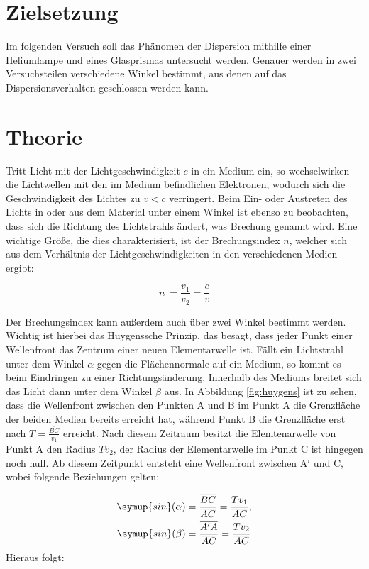 \section{Zielsetzung}
Im folgenden Versuch soll das Phänomen der Dispersion mithilfe einer Heliumlampe und eines Glasprismas untersucht werden. Genauer werden in zwei Versuchsteilen verschiedene Winkel bestimmt, aus denen auf das Dispersionsverhalten geschlossen werden kann.


\section{Theorie}
Tritt Licht mit der Lichtgeschwindigkeit $c$ in ein Medium ein, so wechselwirken die Lichtwellen mit den im Medium befindlichen Elektronen, wodurch sich die Geschwindigkeit des Lichtes  zu $v < c$ verringert. Beim Ein- oder Austreten des Lichts in oder aus 
dem Material unter einem Winkel ist ebenso zu beobachten, dass sich die Richtung des Lichtstrahls ändert, was Brechung genannt wird. Eine wichtige Größe, die dies charakterisiert, ist der Brechungsindex $n$, welcher sich aus dem Verhältnis der Lichtgeschwindigkeiten 
in den verschiedenen Medien ergibt:

\begin{equation}
n \:= \frac{v_1}{v_2} = \frac{c}{v}
\end{equation}

Der Brechungsindex kann außerdem auch über zwei Winkel bestimmt werden. Wichtig ist hierbei das Huygenssche Prinzip, das besagt, dass jeder Punkt einer Wellenfront das Zentrum einer neuen Elementarwelle ist. Fällt ein Lichtstrahl unter dem Winkel $\alpha$ gegen 
die Flächennormale auf ein Medium, so kommt es beim Eindringen zu einer Richtungsänderung. Innerhalb des Mediums breitet sich das Licht dann unter dem Winkel $\beta$ aus. 
In Abbildung \ref{fig:huygens} ist zu sehen, dass die Wellenfront zwischen den Punkten A und B im  Punkt A die Grenzfläche der beiden Medien bereits erreicht hat, während Punkt B die Grenzfläche erst nach $T = \frac{\overline{BC}}{v_1}$ erreicht. Nach diesem Zeitraum besitzt die Elemtenarwelle von 
Punkt A den Radius $Tv_2$, der Radius der Elementarwelle im Punkt C ist hingegen noch null. Ab diesem Zeitpunkt entsteht eine Wellenfront zwischen A‘ und C, wobei folgende Beziehungen gelten:

\begin{equation}
\begin{aligned}
\symup{sin}(\alpha) &= \frac{\overline{BC}}{\overline{AC}} = \frac{Tv_1}{\overline{AC}}, \\
\symup{sin}(\beta) &= \frac{\overline{A'A}}{\overline{AC}} = \frac{Tv_2}{\overline{AC}} \\
\end{aligned}
\end{equation}
Hieraus folgt:

